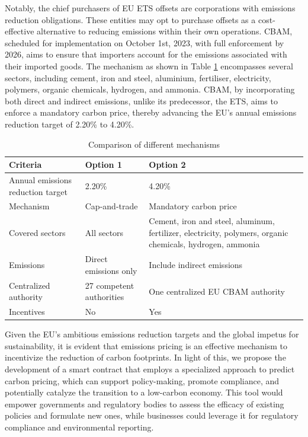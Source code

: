 \documentclass[sigconf, authordraft]{acmart}
\begin{document}
	Notably, the chief purchasers of EU ETS offsets are corporations with
	emissions reduction obligations. These entities may opt to purchase offsets as
	a cost-effective alternative to reducing emissions within their own operations.
	CBAM, scheduled for implementation on October 1st, 2023, with full enforcement
	by 2026, aims to ensure that importers account for the emissions associated
	with their imported goods. The mechanism as shown in Table \ref{tab:comparison_of_different_mechanisms}
	encompasses several sectors, including cement, iron and steel, aluminium, fertiliser,
	electricity, polymers, organic chemicals, hydrogen, and ammonia. CBAM, by
	incorporating both direct and indirect emissions, unlike its predecessor, the
	ETS, aims to enforce a mandatory carbon price, thereby advancing the EU's
	annual emissions reduction target of 2.20\% to 4.20\%.

	\begin{table}[h]
		\caption{Comparison of different mechanisms}
		\begin{tabularx}
			{\linewidth}{|X|X|X|} \hline \textbf{Criteria} & \textbf{Option 1} &
			\textbf{Option 2} \\ \hline Annual emissions reduction target & 2.20\% &
			4.20\% \\ \hline Mechanism & Cap-and-trade & Mandatory carbon price \\ \hline
			Covered sectors & All sectors & Cement, iron and steel, aluminum,
			fertilizer, electricity, polymers, organic chemicals, hydrogen, ammonia \\
			\hline Emissions & Direct emissions only & Include indirect emissions \\ \hline
			Centralized authority & 27 competent authorities & One centralized EU CBAM
			authority \\ \hline Incentives & No & Yes \\ \hline
		\end{tabularx}
		\label{tab:comparison_of_different_mechanisms}
	\end{table}

	Given the EU's ambitious emissions reduction targets and the global impetus for
	sustainability, it is evident that emissions pricing is an effective mechanism
	to incentivize the reduction of carbon footprints. In light of this, we
	propose the development of a smart contract that employs a specialized
	approach to predict carbon pricing, which can support policy-making, promote
	compliance, and potentially catalyze the transition to a low-carbon economy.
	This tool would empower governments and regulatory bodies to assess the
	efficacy of existing policies and formulate new ones, while businesses could leverage
	it for regulatory compliance and environmental reporting.
\end{document}
